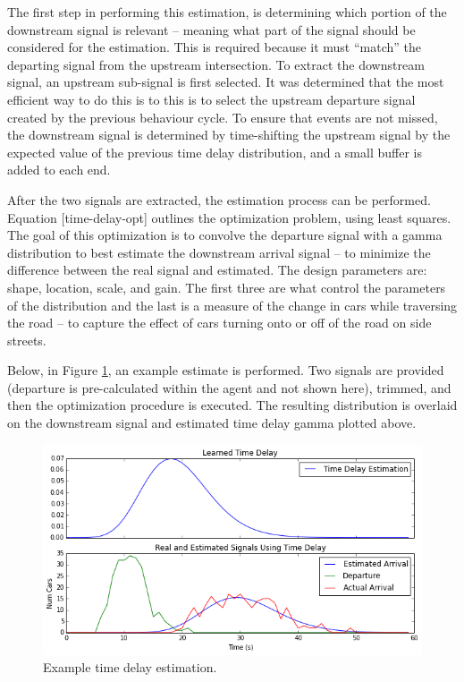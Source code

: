 \documentclass{report}
\begin{document}
The first step in performing this estimation, is determining which portion of the downstream signal is relevant – meaning what part of the signal should be considered for the estimation. 
This is required because it must ``match” the departing signal from the upstream intersection. 
To extract the downstream signal, an upstream sub-signal is first selected. It was determined that the most efficient way to do this is to this is to select the upstream departure signal created by the previous behaviour cycle. 
To ensure that events are not missed, the downstream signal is determined by time-shifting the upstream signal by the expected value of the previous time delay distribution, and a small buffer is added to each end.

After the two signals are extracted, the estimation process can be performed. 
Equation [time-delay-opt] outlines the optimization problem, using least squares. 
The goal of this optimization is to convolve the departure signal with a gamma distribution to best estimate the downstream arrival signal -- to minimize the difference between the real signal and estimated. 
The design parameters are: shape, location, scale, and gain. 
The first three are what control the parameters of the distribution and the last is a measure of the change in cars while traversing the road -- to capture the effect of cars turning onto or off of the road on side streets.

Below, in Figure \ref{fig:time-delay-est}, an example estimate is performed. 
Two signals are provided (departure is pre-calculated within the agent and not shown here), trimmed, and then the optimization procedure is executed. 
The resulting distribution is overlaid on the downstream signal and estimated time delay gamma plotted above.

\begin{figure}[htbp!]
  \begin{centering}
    \includegraphics[scale=0.75]{figures/time-delay-est.png}
    \caption{Example time delay estimation.}
    \label{fig:time-delay-est}
  \end{centering}
\end{figure}
\end{document}

